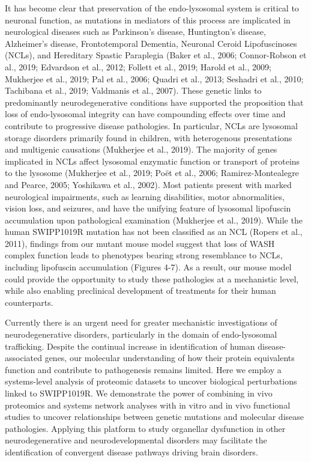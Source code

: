 	It has become clear that preservation of the endo-lysosomal system is
critical to neuronal function, as mutations in mediators of this process are
implicated in neurological diseases such as Parkinson’s disease, Huntington’s
disease, Alzheimer’s disease, Frontotemporal Dementia, Neuronal Ceroid
Lipofuscinoses (NCLs), and Hereditary Spastic Paraplegia (Baker et al., 2006;
Connor-Robson et al., 2019; Edvardson et al., 2012; Follett et al., 2019; Harold
et al., 2009; Mukherjee et al., 2019; Pal et al., 2006; Quadri et al., 2013;
Seshadri et al., 2010; Tachibana et al., 2019; Valdmanis et al., 2007). These
genetic links to predominantly neurodegenerative conditions have supported the
proposition that loss of endo-lysosomal integrity can have compounding effects
over time and contribute to progressive disease pathologies. In particular, NCLs
are lysosomal storage disorders primarily found in children, with heterogenous
presentations and multigenic causations (Mukherjee et al., 2019). The majority
of genes implicated in NCLs affect lysosomal enzymatic function or transport of
proteins to the lysosome (Mukherjee et al., 2019; Poët et al., 2006;
Ramirez-Montealegre and Pearce, 2005; Yoshikawa et al., 2002). Most patients
present with marked neurological impairments, such as learning disabilities,
motor abnormalities, vision loss, and seizures, and have the unifying feature of
lysosomal lipofuscin accumulation upon pathological examination (Mukherjee et
al., 2019). While the human SWIPP1019R mutation has not been classified as an
NCL (Ropers et al., 2011), findings from our mutant mouse model suggest that
loss of WASH complex function leads to phenotypes bearing strong resemblance to
NCLs, including lipofuscin accumulation (Figures 4-7). As a result, our mouse
model could provide the opportunity to study these pathologies at a mechanistic
level, while also enabling preclinical development of treatments for their human
counterparts. 

Currently there is an urgent need for greater mechanistic investigations of
neurodegenerative disorders, particularly in the domain of endo-lysosomal
trafficking. Despite the continual increase in identification of human
disease-associated genes, our molecular understanding of how their protein
equivalents function and contribute to pathogenesis remains limited. Here we
employ a systems-level analysis of proteomic datasets to uncover biological
perturbations linked to SWIPP1019R. We demonstrate the power of combining in
vivo proteomics and systems network analyses with in vitro and in vivo
functional studies to uncover relationships between genetic mutations and
molecular disease pathologies. Applying this platform to study organellar
dysfunction in other neurodegenerative and neurodevelopmental disorders may
facilitate the identification of convergent disease pathways driving brain
disorders. 
